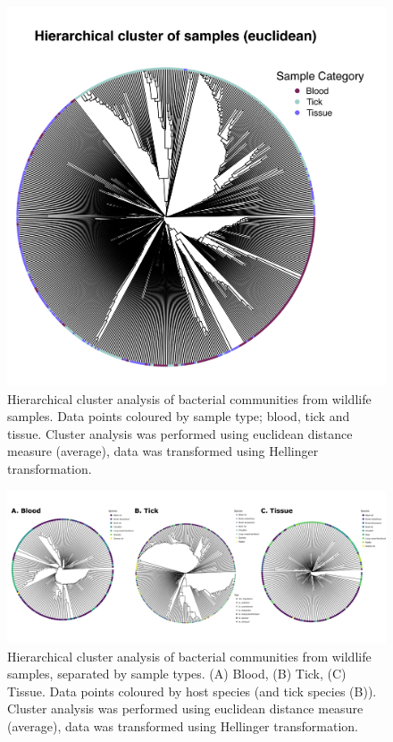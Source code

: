 \documentclass[a4paper, nobind]{templates/ociamthesis}
\begin{document}
\begin{figure}
\includegraphics[width=0.95\linewidth]{figures/ms-figs-appendix/FigA-3.9} \caption[Hierarchical cluster analysis of bacterial communities - all samples]{Hierarchical cluster analysis of bacterial communities from wildlife samples. Data points coloured by sample type; blood, tick and tissue. Cluster analysis was performed using euclidean distance measure (average), data was transformed using Hellinger transformation.}\label{fig:FA39}
\end{figure}

\newpage

\begin{figure}
\includegraphics[width=0.95\linewidth]{figures/ms-figs-appendix/FigA-3.10} \caption[Hierarchical cluster analysis of bacterial communities - by sample type]{Hierarchical cluster analysis of bacterial communities from wildlife samples, separated by sample types. (A) Blood, (B) Tick, (C) Tissue. Data points coloured by host species (and tick species (B)). Cluster analysis was performed using euclidean distance measure (average), data was transformed using Hellinger transformation.}\label{fig:FA310}
\end{figure}
\end{document}
